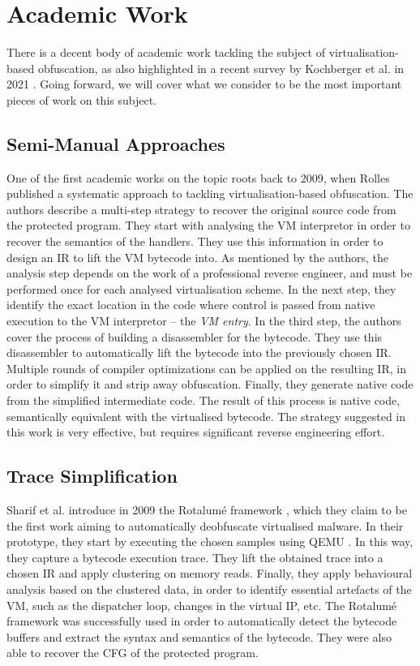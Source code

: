 \section{Academic Work}

There is a decent body of academic work tackling the subject of virtualisation-based obfuscation, as also highlighted in a recent survey by Kochberger et al. in 2021 \cite{kochberger2021sok}. Going forward, we will cover what we consider to be the most important pieces of work on this subject.

\subsection{Semi-Manual Approaches}

One of the first academic works on the topic roots back to 2009, when Rolles \cite{rolles2009unpacking} published a systematic approach to tackling virtualisation-based obfuscation. The authors describe a multi-step strategy to recover the original source code from the protected program. They start with analysing the \gls{VM} interpretor in order to recover the semantics of the handlers. They use this information in order to design an \gls{IR} to lift the \gls{VM} bytecode into. As mentioned by the authors, the analysis step depends on the work of a professional reverse engineer, and must be performed once for each analysed virtualisation scheme. In the next step, they identify the exact location in the code where control is passed from native execution to the \gls{VM} interpretor -- the \emph{\gls{VM} entry}. In the third step, the authors cover the process of building a disassembler for the bytecode. They use this disassembler to automatically lift the bytecode into the previously chosen \gls{IR}. Multiple rounds of compiler optimizations can be applied on the resulting \gls{IR}, in order to simplify it and strip away obfuscation. Finally, they generate native  code from the simplified intermediate code. The result of this process is native code, semantically equivalent with the virtualised bytecode. The strategy suggested in this work is very effective, but requires significant reverse engineering effort.

\subsection{Trace Simplification}

Sharif et al. introduce in 2009 the Rotalumé framework \cite{sharif2009}, which they claim to be the first work aiming to automatically deobfuscate virtualised malware. In their prototype, they start by executing the chosen samples using QEMU \cite{qemu}. In this way, they capture a bytecode execution trace. They lift the obtained trace into a chosen \gls{IR} and apply clustering on memory reads. Finally, they apply behavioural analysis based on the clustered data, in order to identify essential artefacts of the \gls{VM}, such as the dispatcher loop, changes in the virtual \gls{IP}, etc. The Rotalumé framework was successfully used in order to automatically detect the bytecode buffers and extract the syntax and semantics of the bytecode. They were also able to recover the \gls{CFG} of the protected program.

